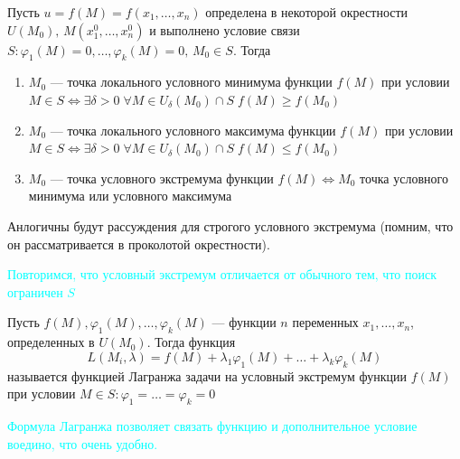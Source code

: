 \begin{Def}
    Пусть $u = f(M) = f(x_1, \dots, x_n)$ определена в некоторой окрестности $U(M_0), \, M(x^0_1, \dots, x^0_n)$ и выполнено условие связи $S : \varphi_1(M) = 0, \dots, \varphi_k(M) = 0, \, M_0 \in S$. Тогда
        \begin{enumerate}
            \item $M_0$ --- точка локального условного минимума функции $f(M)$ при условии $M \in S \Leftrightarrow \exists \delta > 0 \; \forall M \in U_\delta(M_0) \cap S \; f(M) \geqslant f(M_0)$
            
            \item $M_0$ --- точка локального условного максимума функции $f(M)$ при условии $M \in S \Leftrightarrow \exists \delta > 0 \; \forall M \in U_\delta(M_0) \cap S \; f(M) \leqslant f(M_0)$
                        
            \item $M_0$ --- точка условного экстремума функции $f(M) \Leftrightarrow M_0$ точка условного минимума или условного максимума 
        \end{enumerate}
    Анлогичны будут рассуждения для строгого условного экстремума (помним, что он рассматривается в проколотой окрестности).
\end{Def}

\textcolor{cyan}{Повторимся, что условный экстремум отличается от обычного тем, что поиск ограничен $S$}

\begin{Def}
    Пусть $f(M), \varphi_1(M), \dots, \varphi_k(M)$ --- функции $n$ переменных $x_1, \dots, x_n$, определенных в $U(M_0)$. Тогда функция 
    \[
        L(M_i, \lambda) = f(M) + \lambda_1 \varphi_1(M) + \dots + \lambda_k \varphi_k(M)
    \] называется функцией Лагранжа задачи на условный экстремум функции $f(M)$ при условии $M \in S : \varphi_1 = \dots = \varphi_k = 0$
\end{Def}
\textcolor{cyan}{Формула Лагранжа позволяет связать функцию и дополнительное условие воедино, что очень удобно.}

